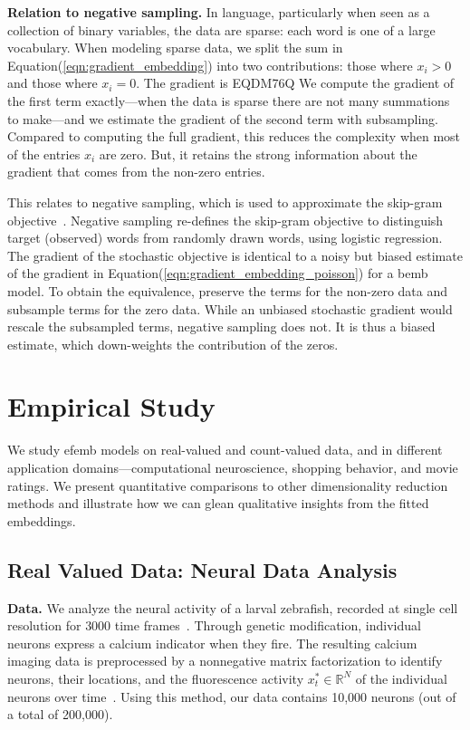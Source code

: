 \documentclass[12pt]{article}
\DeclareRobustCommand{\parhead}[1]{\vspace{0.05in} \textbf{#1} }
\begin{document}
\parhead{Relation to negative sampling.} In language, particularly
when seen as a collection of binary variables, the data are sparse:
each word is one of a large vocabulary. When modeling sparse data, we
split the sum in Equation\nobreakspace \textup {(\ref {eqn:gradient_embedding})} into two contributions:
those where $x_{i}>0$ and those where $x_{i}=0$.  The gradient is
EQDM76Q
We compute the gradient of the first term exactly---when the data is
sparse there are not many summations to make---and we estimate the
gradient of the second term with subsampling.  Compared to computing
the full gradient, this reduces the complexity when most of the
entries $x_{i}$ are zero.  But, it retains the strong information
about the gradient that comes from the non-zero entries.

This relates to negative sampling, which is used to approximate the
skip-gram objective~\citep{mikolov2013distributed}.  Negative sampling
re-defines the skip-gram objective to distinguish target (observed)
words from randomly drawn words, using logistic regression. The
gradient of the stochastic objective is identical to a noisy but
biased estimate of the gradient in
Equation\nobreakspace \textup {(\ref {eqn:gradient_embedding_poisson})} for a \gls{bemb} model.  To
obtain the equivalence, preserve the terms for the non-zero data and
subsample terms for the zero data.  While an unbiased stochastic
gradient would rescale the subsampled terms, negative sampling does
not.  It is thus a biased estimate, which down-weights the
contribution of the zeros.

\section{Empirical Study}
\label{sec:experiments}
\glsresetall

We study \gls{efemb} models on real-valued and count-valued data, and
in different application domains---computational neuroscience,
shopping behavior, and movie ratings.  We present quantitative
comparisons to other dimensionality reduction methods and illustrate how we
can glean qualitative insights from the fitted embeddings.

\subsection{Real Valued Data: Neural Data Analysis}

\parhead{Data.}  We analyze the neural activity of a larval zebrafish,
recorded at single cell resolution for $3000$ time
frames~\citep{ahrens2013whole}.  Through genetic modification,
individual neurons express a calcium indicator when they fire.  The
resulting calcium imaging data is preprocessed by a nonnegative matrix
factorization to identify neurons, their locations, and the
fluorescence activity $x^*_t \in \mathbb{R}^N$ of the individual
neurons over time~\citep{friedrich2015fast}.  Using this method, our
data contains 10,000 neurons (out of a total of 200,000).
\end{document}
